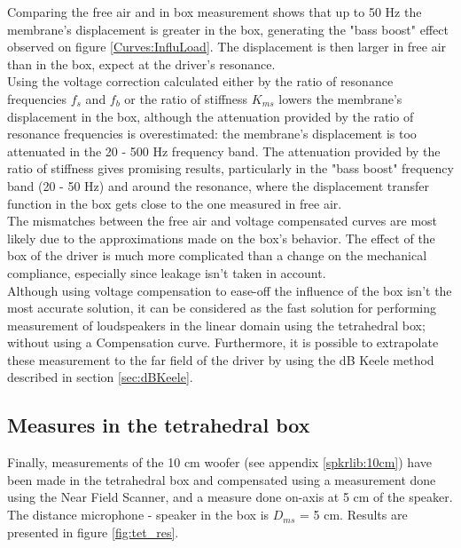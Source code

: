 \documentclass{report}
\begin{document}
Comparing the free air and in box measurement shows that up to 50 Hz the membrane's displacement is greater in the box, generating the "bass boost" effect observed on figure \ref{Curves:InfluLoad}. The displacement is then larger in free air than in the box, expect at the driver's resonance.\\
Using the voltage correction calculated either by the ratio of resonance frequencies $f_{s}$ and $f_{b}$ or the ratio of stiffness $K_{ms}$ lowers the membrane's displacement in the box, although the attenuation provided by the ratio of resonance frequencies is overestimated: the membrane's displacement is too attenuated in the 20 - 500 Hz frequency band. The attenuation provided by the ratio of stiffness gives promising results, particularly in the "bass boost" frequency band (20 - 50 Hz) and around the resonance, where the displacement transfer function in the box gets close to the one measured in free air. \\

The mismatches between the free air and voltage compensated curves are most likely due to the approximations made on the box's behavior. The effect of the box of the driver is much more complicated than a change on the mechanical compliance, especially since leakage isn't taken in account.  \\

Although using voltage compensation to ease-off the influence of the box isn't the most accurate solution, it can be considered as the fast solution for performing measurement of loudspeakers in the linear domain using the tetrahedral box; without using a Compensation curve. Furthermore, it is possible to extrapolate these measurement to the far field of the driver by using the dB Keele method described in section \ref{sec:dBKeele}.

\subsection{Measures in the tetrahedral box}

Finally, measurements of the 10 cm woofer (see appendix \ref{spkrlib:10cm}) have been made in the tetrahedral box and compensated using a measurement done using the Near Field Scanner, and a measure done on-axis at 5 cm of the speaker.\\
The distance microphone - speaker in the box is $D_{ms}$ = 5 cm. Results are presented in figure \ref{fig:tet_res}.\\
\end{document}
